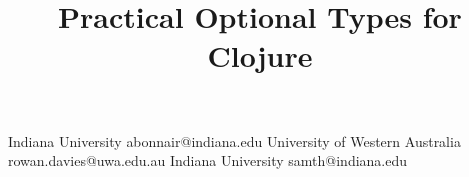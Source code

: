 \documentclass[preprint,9pt,twocolumn,nocopyrightspace,authoryear]{sigplanconf}
\newcounter{ex}
\begin{document}
\setlength{\pdfpageheight}{\paperheight}
\setlength{\pdfpagewidth}{\paperwidth}


\newcommand{\clj}[1]{\texttt{#1}}





\title{Practical Optional Types for Clojure}

           {Indiana University}
           {abonnair@indiana.edu}
           {University of Western Australia}
           {rowan.davies@uwa.edu.au}
           {Indiana University}
           {samth@indiana.edu}

\maketitle
\end{document}
